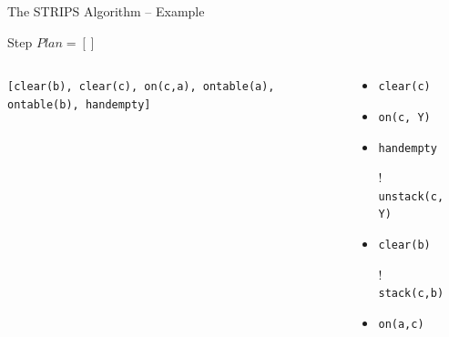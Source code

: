 \documentclass[presentation]{beamer}\mode<presentation>{\usetheme{AMSBolognaFC}}
\begin{document}
\begin{frame}[c]{The STRIPS Algorithm -- Example}
\small

    \begin{exampleblock}{Step \nextStripsExampleStep{} \hfill $Plan = []$}
        \begin{columns}[t]
            \begin{column}{.30\linewidth}\centering
                \texttt{[clear(b), \alert{clear(c)}, on(c,a), ontable(a), ontable(b), handempty]}
            \end{column}
            \begin{column}{.50\linewidth}\centering
                \begin{itemize}
                    \item \alert{\texttt{clear(c)}}
                    \item \texttt{on(c, Y)}
                    \item \texttt{handempty}
                    \item[!] \texttt{unstack(c, Y)}
                    \item \texttt{clear(b)}
                    \item[!] \texttt{stack(c,b)}
                    \item \texttt{on(a,c)}
                \end{itemize}
            \end{column}
            \begin{column}{.10\linewidth}\centering
                
            \end{column}
        \end{columns}
    \end{exampleblock}

\end{frame}
\end{document}
